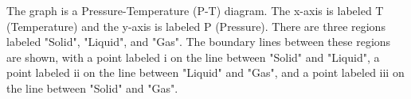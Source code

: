 The graph is a Pressure-Temperature (P-T) diagram. The x-axis is labeled T (Temperature) and the y-axis is labeled P (Pressure). There are three regions labeled "Solid", "Liquid", and "Gas". The boundary lines between these regions are shown, with a point labeled i on the line between "Solid" and "Liquid", a point labeled ii on the line between "Liquid" and "Gas", and a point labeled iii on the line between "Solid" and "Gas".